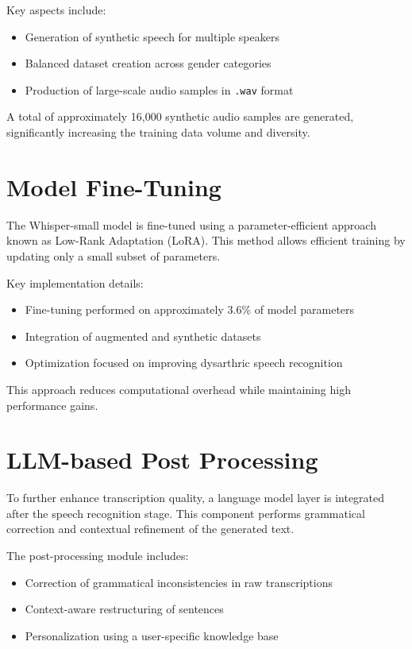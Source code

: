 Key aspects include:
\begin{itemize}
\item Generation of synthetic speech for multiple speakers
\item Balanced dataset creation across gender categories
\item Production of large-scale audio samples in \texttt{.wav} format
\end{itemize}

A total of approximately 16,000 synthetic audio samples are generated, significantly increasing the training data volume and diversity.

\section{Model Fine-Tuning}
The Whisper-small model is fine-tuned using a parameter-efficient approach known as Low-Rank Adaptation (LoRA). This method allows efficient training by updating only a small subset of parameters.

Key implementation details:
\begin{itemize}
\item Fine-tuning performed on approximately 3.6\% of model parameters
\item Integration of augmented and synthetic datasets
\item Optimization focused on improving dysarthric speech recognition
\end{itemize}

This approach reduces computational overhead while maintaining high performance gains.

\section{LLM-based Post Processing}
To further enhance transcription quality, a language model layer is integrated after the speech recognition stage. This component performs grammatical correction and contextual refinement of the generated text.

The post-processing module includes:
\begin{itemize}
\item Correction of grammatical inconsistencies in raw transcriptions
\item Context-aware restructuring of sentences
\item Personalization using a user-specific knowledge base
\end{itemize}

